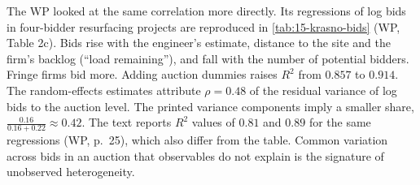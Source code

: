 The WP looked at the same correlation more directly. Its regressions of log bids in four-bidder
resurfacing projects are reproduced in \cref{tab:15-krasno-bids} (WP, Table 2c). Bids rise with the
engineer's estimate, distance to the site and the firm's backlog (``load remaining''), and fall with
the number of potential bidders. Fringe firms bid more. Adding auction dummies raises $R^2$ from
$0.857$ to $0.914$. The random-effects estimates attribute $\rho=0.48$ of the residual variance of log
bids to the auction level. The printed variance components imply a smaller share,
$\frac{0.16}{0.16+0.22}\approx0.42$. The text reports $R^2$ values of $0.81$ and $0.89$ for the same
regressions (WP, p.~25), which also differ from the table.
Common variation across bids in an auction that observables do not explain is the signature of
unobserved heterogeneity.

